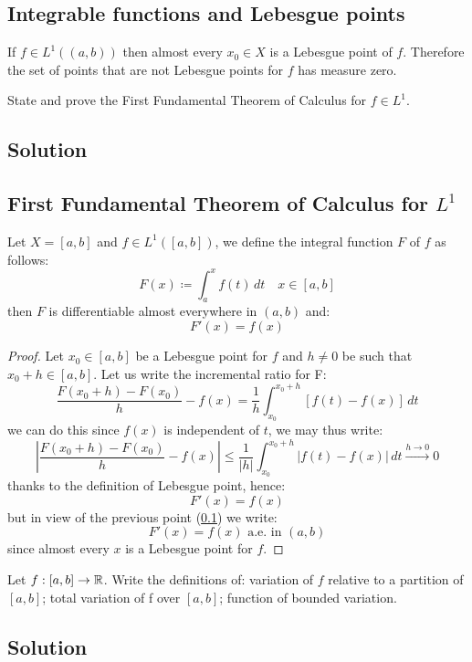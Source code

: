 \subsection{Integrable functions and Lebesgue points}\label{intfunc:lebpoi}
If $f\in L^1((a,b))$ then almost every $x_0 \in X$ is a Lebesgue point of $f$. Therefore the set of points that are not Lebesgue points for $f$ has measure zero.


\question
State and prove the First Fundamental Theorem of Calculus for $f \in L^1$.

\subsection*{Solution}

\subsection{First Fundamental Theorem of Calculus for \texorpdfstring{$L^1$}{L1}}
Let $X=[a,b]$ and $f \in L^1([a,b])$, we define the integral function $F$ of $f$ as follows:
\[
    F(x) \coloneqq \int_a^x f(t) \, dt \quad x \in [a,b]
\]
then $F$ is differentiable almost everywhere in $(a,b)$ and:
\[
    F'(x) = f(x)    
\]

\begin{proof}
    Let $x_0 \in [a,b]$ be a Lebesgue point for $f$ and $h\neq 0$ be such that $x_0+h \in [a,b]$. Let us write the incremental ratio for F:
    \[
        \frac{F(x_0+h)-F(x_0)}{h} - f(x) = \frac{1}{h} \int_{x_0}^{x_0+h} [f(t) - f(x)] \, dt    
    \]
    we can do this since $f(x)$ is independent of $t$, we may thus write:
    \[
        \left| \frac{F(x_0+h)-F(x_0)}{h} - f(x) \right| \leq \frac{1}{|h|} \int_{x_0}^{x_0+h} |f(t) - f(x)| \, dt \xrightarrow{h\to0} 0
    \]
    thanks to the definition of Lebesgue point, hence:
    \[
        F'(x) = f(x)    
    \]
    but in view of the previous point (\ref{intfunc:lebpoi}) we write:
    \[
        F'(x) = f(x) \text{ a.e. in } (a,b)
    \]
    since almost every $x$ is a Lebesgue point for $f$.
\end{proof}



\question
Let $f : [a, b] \to \mathbb{R}$. Write the definitions of: variation of $f$ relative to a partition of $[a, b]$; total variation of f over $[a, b]$; function of bounded variation.

\subsection*{Solution}

